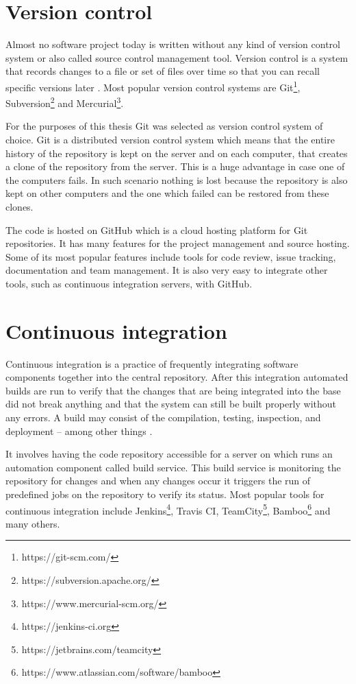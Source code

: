 \documentclass[
  digital, %
  table,   %
  lof,     %
  nolot,     %
]{fithesis3}
\begin{document}
\section{Version control}
Almost no software project today is written without any kind of version control system or also called source control management tool. Version control is a system that records changes to a file or set of files over time so that you can recall specific versions later \cite{proGit}. Most popular version control systems are Git\footnote{https://git-scm.com/}, Subversion\footnote{https://subversion.apache.org/} and Mercurial\footnote{https://www.mercurial-scm.org/}.

For the purposes of this thesis Git was selected as version control system of choice. Git is a distributed version control system which means that the entire history of the repository is kept on the server and on each computer, that creates a clone of the repository from the server. This is a huge advantage in case one of the computers fails. In such scenario nothing is lost because the repository is also kept on other computers and the one which failed can be restored from these clones.

The code is hosted on GitHub which is a cloud hosting platform for Git repositories. It has many features for the project management and source hosting. Some of its most popular features include tools for code review, issue tracking, documentation and team management. It is also very easy to integrate other tools, such as continuous integration servers, with GitHub.

\section{Continuous integration}
Continuous integration is a practice of frequently integrating software components together into the central repository. After this integration automated builds are run to verify that the changes that are being integrated into the base did not break anything and that the system can still be built properly without any errors. A build may consist of the compilation, testing, inspection, and deployment -- among other things \cite{ci}.

It involves having the code repository accessible for a server on which runs an automation component called build service. This build service is monitoring the repository for changes and when any changes occur it triggers the run of predefined jobs on the repository to verify its status. Most popular tools for continuous integration include Jenkins\footnote{https://jenkins-ci.org}, Travis CI, TeamCity\footnote{https://jetbrains.com/teamcity}, Bamboo\footnote{https://www.atlassian.com/software/bamboo} and many others.
\end{document}
